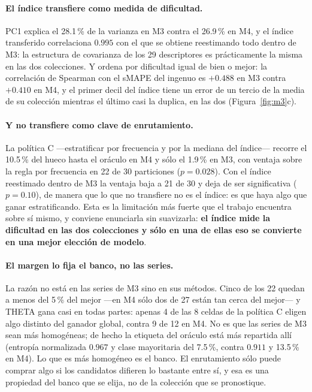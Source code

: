 \paragraph{El índice transfiere como medida de dificultad.} PC1 explica el 28.1\,\% de la
varianza en M3 contra el 26.9\,\% en M4, y el índice transferido correlaciona $0.995$ con
el que se obtiene reestimando todo dentro de M3: la estructura de covarianza de los 29
descriptores es prácticamente la misma en las dos colecciones. Y ordena por dificultad
igual de bien o mejor: la correlación de Spearman con el sMAPE del ingenuo es $+0.488$ en
M3 contra $+0.410$ en M4, y el primer decil del índice tiene un error de un tercio de la
media de su colección mientras el último casi la duplica, en las dos
(Figura~\ref{fig:m3}c).

\paragraph{Y no transfiere como clave de enrutamiento.} La política C ---estratificar por
frecuencia y por la mediana del índice--- recorre el 10.5\,\% del hueco hasta el oráculo
en M4 y sólo el 1.9\,\% en M3, con ventaja sobre la regla por frecuencia en 22 de 30
particiones ($p=0.028$). Con el índice reestimado dentro de M3 la ventaja baja a 21 de 30
y deja de ser significativa ($p=0.10$), de manera que lo que no transfiere no es el
índice: es que haya algo que ganar estratificando. Esta es la limitación más fuerte que
el trabajo encuentra sobre sí mismo, y conviene enunciarla sin suavizarla: \textbf{el
índice mide la dificultad en las dos colecciones y sólo en una de ellas eso se convierte
en una mejor elección de modelo}.

\paragraph{El margen lo fija el banco, no las series.} La razón no está en las series de
M3 sino en sus métodos. Cinco de los 22 quedan a menos del 5\,\% del mejor ---en M4 sólo
dos de 27 están tan cerca del mejor--- y THETA gana casi en todas partes: apenas 4 de las
8 celdas de la política C eligen algo distinto del ganador global, contra 9 de 12 en M4.
No es que las series de M3 sean más homogéneas; de hecho la etiqueta del oráculo está más
repartida allí (entropía normalizada $0.967$ y clase mayoritaria del 7.5\,\%, contra
$0.911$ y 13.5\,\% en M4). Lo que es más homogéneo es el banco. El enrutamiento sólo puede
comprar algo si los candidatos difieren lo bastante entre sí, y esa es una propiedad del
banco que se elija, no de la colección que se pronostique.

